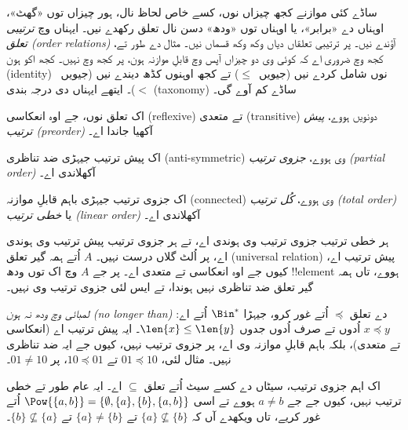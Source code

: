 \documentclass[../../../include/open-logic-section]{subfiles}
\begin{document}

\begin{explain}
ساڈے کئی موازنے کجھ چیزاں نوں، کسے خاص لحاظ نال، ہور چیزاں توں
«گھٹ»، اوہناں دے «برابر»، یا اوہناں توں «ودھ» دسن نال تعلق رکھدے نیں۔
ایہناں وچ \emph{ترتیبی تعلق (order relations)} آؤندے نیں۔ پر ترتیبی تعلقاں دیاں وکھ وکھ
قسماں نیں۔ مثال دے طور تے، کجھ وچ ضروری اے کہ کوئی وی دو چیزاں آپس وچ
قابلِ موازنہ ہون، پر کجھ وچ نہیں۔ کجھ اکو ہون (identity) نوں شامل کردے نیں
(جیویں~$\le$) تے کجھ اوہنوں کڈھ دیندے نیں (جیویں~$<$)۔
ایتھے ایہناں دی درجہ بندی (taxonomy) ساڈے کم آوے گی۔
\end{explain}

\begin{defn}
اک تعلق نوں، جے اوہ انعکاسی (reflexive) تے متعدی (transitive) دونویں ہووے،
\emph{پیش ترتیب (preorder)} آکھیا جاندا اے۔
\end{defn}

\begin{defn}
اک پیش ترتیب جیہڑی ضد تناظری (anti-symmetric) وی ہووے، \emph{جزوی ترتیب
(partial order)} آکھلاندی اے۔
\end{defn}

\begin{defn}
اک جزوی ترتیب جیہڑی باہم قابلِ موازنہ (connected) وی ہووے، \emph{کُل ترتیب
(total order)} یا \emph{خطی ترتیب (linear order)} آکھلاندی اے۔
\end{defn}

\begin{ex}
ہر خطی ترتیب جزوی ترتیب وی ہوندی اے، تے ہر جزوی ترتیب پیش ترتیب وی
ہوندی اے، پر اُلٹ گلاں درست نہیں۔ $A$ اُتے ہمہ گیر تعلق (universal relation) پیش ترتیب اے، کیوں
جے اوہ انعکاسی تے متعدی اے۔ پر جے $A$ وچ اک توں ودھ !!{element} ہووے،
تاں ہمہ گیر تعلق ضد تناظری نہیں ہوندا، تے ایس لئی
جزوی ترتیب وی نہیں۔
\end{ex}

\begin{ex}
\emph{لمبائی وچ ودھ نہ ہون (no longer than)} دے تعلق $\preccurlyeq$ اُتے غور
کرو، جیہڑا $\Bin^*$ اُتے اے: $x \preccurlyeq y$ اُدوں تے صرف اُدوں جدوں
$\len{x} \le \len{y}$۔
ایہ پیش ترتیب اے (انعکاسی تے متعدی)، بلکہ باہم قابلِ موازنہ وی اے، پر
جزوی ترتیب نہیں، کیوں جے ایہ ضد تناظری نہیں۔ مثال لئی، $01
\preccurlyeq 10$ تے $10 \preccurlyeq 01$، پر $01 \neq 10$۔
\end{ex}

\begin{ex}
اک اہم جزوی ترتیب، سیٹاں دے کسے سیٹ اُتے تعلق $\subseteq$ اے۔ ایہ عام
طور تے خطی ترتیب نہیں، کیوں جے جے $a \neq b$ ہووے تے اسی
$\Pow{\{a, b\}} = \{\emptyset, \{a\}, \{b\}, \{a,b\}\}$ اُتے غور کریے،
تاں ویکھدے آں کہ $\{a\} \nsubseteq \{b\}$ تے $\{a\} \neq \{b\}$ تے
$\{b\} \nsubseteq \{a\}$۔
\end{ex}
\end{document}
